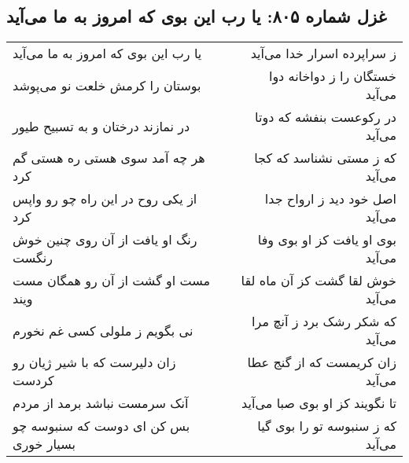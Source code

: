 \begin{center}
\section*{غزل شماره ۸۰۵: یا رب این بوی که امروز به ما می‌آید}
\label{sec:0805}
\begin{longtable}{l p{0.5cm} r}
یا رب این بوی که امروز به ما می‌آید
&&
ز سراپرده اسرار خدا می‌آید
\\
بوستان را کرمش خلعت نو می‌پوشد
&&
خستگان را ز دواخانه دوا می‌آید
\\
در نمازند درختان و به تسبیح طیور
&&
در رکوعست بنفشه که دوتا می‌آید
\\
هر چه آمد سوی هستی ره هستی گم کرد
&&
که ز مستی نشناسد که کجا می‌آید
\\
از یکی روح در این راه چو رو واپس کرد
&&
اصل خود دید ز ارواح جدا می‌آید
\\
رنگ او یافت از آن روی چنین خوش رنگست
&&
بوی او یافت کز او بوی وفا می‌آید
\\
مست او گشت از آن رو همگان مست ویند
&&
خوش لقا گشت کز آن ماه لقا می‌آید
\\
نی بگویم ز ملولی کسی غم نخورم
&&
که شکر رشک برد ز آنچ مرا می‌آید
\\
زان دلیرست که با شیر ژیان رو کردست
&&
زان کریمست که از گنج عطا می‌آید
\\
آنک سرمست نباشد برمد از مردم
&&
تا نگویند کز او بوی صبا می‌آید
\\
بس کن ای دوست که سنبوسه چو بسیار خوری
&&
که ز سنبوسه تو را بوی گیا می‌آید
\\
\end{longtable}
\end{center}
